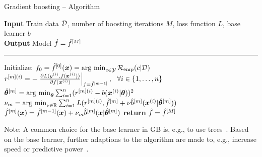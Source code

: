 \documentclass[t,10pt]{beamer}
\begin{document}
\begin{frame}{Gradient boosting -- Algorithm}

  \begin{algorithm}[H]
  \footnotesize
  \caption{GB algorithm}\label{algo:gb}
  \hspace*{\algorithmicindent} \textbf{Input} Train data $\mathcal{D}$, number of boosting iterations $M$, loss function $L$, base learner $b$\\
  \hspace*{\algorithmicindent} \textbf{Output} Model $\hat{f} = \hat{f}^{[M]}$\vspace{0.1cm}
  \hrule
  \begin{algorithmic}[1]
      \State Initialize: $f_0 = \hat{f}^{[0]}(\bm{x}) = \operatorname{arg~min}_{c\in\mathcal{Y}}\mathcal{R}_{\text{emp}}(c|\mathcal{D})$
          \State $r^{[m](i)} = -\left.\frac{\partial L(y^{(i)}, f(\bm{x}^{(i)}))}{\partial f(\bm{x}^{(i)})}\right|_{f = \hat{f}^{[m-1]}},\ \ \forall i \in \{1, \dots, n\}$
          \State $\hat{\bm{\theta}}^{[m]} = \operatorname{arg~min}_{\bm{\theta}} \sum_{i=1}^n(r^{[m](i)} - b(\bm{x}^{(i)} | \bm{\theta}))^2$
          \State $\nu_m = \operatorname{arg~min}_{\nu\in\mathbb{R}} \sum_{i=1}^n L(r^{[m](i)}, \hat{f}^{[m]} + \nu \hat{b}^{[m]}(\bm{x}^{(i)} | \hat{\bm{\theta}}^{[m]}))$
          \State $\hat{f}^{[m]}(\bm{x}) = \hat{f}^{[m-1]}(\bm{x}) + \nu_m \hat{b}^{[m]}(\bm{x} | \hat{\bm{\theta}}^{[m]})$
      \EndWhile
      \State \textbf{return} $\hat{f} = \hat{f}^{[M]}$
  \EndProcedure
  \end{algorithmic}
  \end{algorithm}
  \vspace{-0.5cm}
  Note: A common choice for the base learner in GB is, e.g., to use trees~\citep{friedman2001greedy}. Based on the base learner, further adaptions to the algorithm are made to, e.g., increase speed or predictive power~\citep{chen2015xgboost}.
\end{frame}
\end{document}
